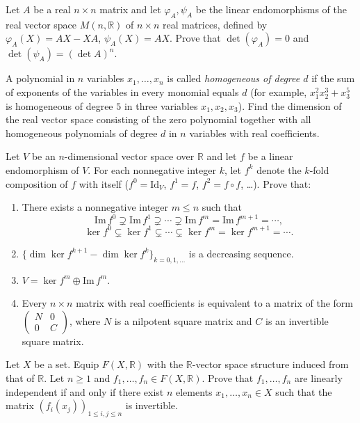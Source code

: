 \documentclass[12pt]{article}
\begin{document}
\begin{problem}
Let $A$ be a real $n\times n$ matrix and let $\varphi_A,\psi_A$ be the linear endomorphisms of the real vector space $M(n,\mathbb{R})$ of $n\times n$ real matrices, defined by $\varphi_A(X)=AX-XA$, $\psi_A(X)=AX$. Prove that $\det(\varphi_A)=0$ and $\det(\psi_A)=(\det A)^n$.
\end{problem}

\begin{problem}
A polynomial in $n$ variables $x_1,\dots,x_n$ is called \emph{homogeneous of degree $d$} if the sum of exponents of the variables in every monomial equals $d$ (for example, $x_1^2x_2^3+x_3^5$ is homogeneous of degree $5$ in three variables $x_1,x_2,x_3$). Find the dimension of the real vector space consisting of the zero polynomial together with all homogeneous polynomials of degree $d$ in $n$ variables with real coefficients.
\end{problem}

\begin{problem}
Let $V$ be an $n$-dimensional vector space over $\mathbb{R}$ and let $f$ be a linear endomorphism of $V$. For each nonnegative integer $k$, let $f^k$ denote the $k$-fold composition of $f$ with itself ($f^0=\mathrm{Id}_V$, $f^1=f$, $f^2=f\circ f$, \dots). Prove that:
\begin{enumerate}[label=\arabic*.]
\item There exists a nonnegative integer $m\leq n$ such that
\[
\mathrm{Im}\,f^0 \supsetneq \mathrm{Im}\,f^1 \supsetneq \cdots \supsetneq \mathrm{Im}\,f^m = \mathrm{Im}\,f^{m+1} = \cdots,
\]
\[
\ker f^0 \subsetneq \ker f^1 \subsetneq \cdots \subsetneq \ker f^m = \ker f^{m+1} = \cdots.
\]
\item $\{\dim\ker f^{k+1}-\dim\ker f^k\}_{k=0,1,\dots}$ is a decreasing sequence.
\item $V = \ker f^m \oplus \mathrm{Im}\,f^m$.
\item Every $n\times n$ matrix with real coefficients is equivalent to a matrix of the form $\begin{pmatrix}N & 0\\0 & C\end{pmatrix}$, where $N$ is a nilpotent square matrix and $C$ is an invertible square matrix.
\end{enumerate}
\end{problem}

\begin{problem}
Let $X$ be a set. Equip $F(X,\mathbb{R})$ with the $\mathbb{R}$-vector space structure induced from that of $\mathbb{R}$. Let $n\geq 1$ and $f_1,\dots,f_n\in F(X,\mathbb{R})$. Prove that $f_1,\dots,f_n$ are linearly independent if and only if there exist $n$ elements $x_1,\dots,x_n\in X$ such that the matrix $(f_i(x_j))_{1\leq i,j\leq n}$ is invertible.
\end{problem}
\end{document}
